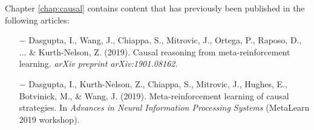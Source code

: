 {Chapter \ref{chap:causal} contains content that has previously been published in the following articles: 
\vspace{-10pt}
\begin{itemize}
    \item[$-$]Dasgupta, I., Wang, J., Chiappa, S., Mitrovic, J., Ortega, P., Raposo, D., ... \& Kurth-Nelson, Z. (2019). Causal reasoning from meta-reinforcement learning. \textit{arXiv preprint arXiv:1901.08162}. 
        \vspace{-10pt}
    \item[$-$] Dasgupta, I., Kurth-Nelson, Z., Chiappa, S., Mitrovic, J., Hughes, E., Botvinick, M., \& Wang, J. (2019). Meta-reinforcement learning of causal strategies.  In \textit{Advances in Neural Information Processing Systems} (MetaLearn 2019 workshop).
    \end{itemize}


}